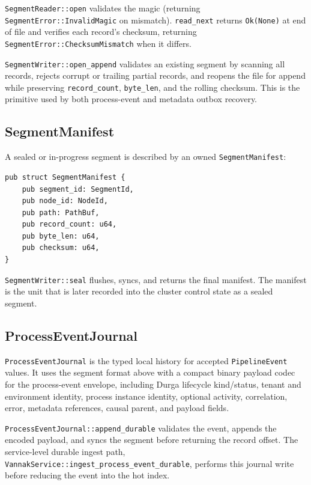 \texttt{SegmentReader::open} validates the magic (returning
\texttt{SegmentError::InvalidMagic} on mismatch). \texttt{read\_next} returns
\texttt{Ok(None)} at end of file and verifies each record's checksum, returning
\texttt{SegmentError::ChecksumMismatch} when it differs.

\texttt{SegmentWriter::open\_append} validates an existing segment by scanning
all records, rejects corrupt or trailing partial records, and reopens the file
for append while preserving \texttt{record\_count}, \texttt{byte\_len}, and the
rolling checksum. This is the primitive used by both process-event and metadata
outbox recovery.

\subsection{SegmentManifest}

A sealed or in-progress segment is described by an owned
\texttt{SegmentManifest}:

\begin{lstlisting}
pub struct SegmentManifest {
    pub segment_id: SegmentId,
    pub node_id: NodeId,
    pub path: PathBuf,
    pub record_count: u64,
    pub byte_len: u64,
    pub checksum: u64,
}
\end{lstlisting}

\texttt{SegmentWriter::seal} flushes, syncs, and returns the final manifest. The
manifest is the unit that is later recorded into the cluster control state as a
sealed segment.

\subsection{ProcessEventJournal}

\texttt{ProcessEventJournal} is the typed local history for accepted
\texttt{PipelineEvent} values. It uses the segment format above with a compact
binary payload codec for the process-event envelope, including Durga lifecycle
kind/status, tenant and environment identity, process instance identity, optional
activity, correlation, error, metadata references, causal parent, and payload
fields.

\texttt{ProcessEventJournal::append\_durable} validates the event, appends the
encoded payload, and syncs the segment before returning the record offset. The
service-level durable ingest path,
\texttt{VannakService::ingest\_process\_event\_durable}, performs this journal
write before reducing the event into the hot index.

